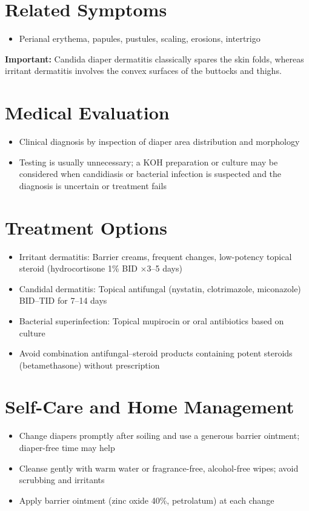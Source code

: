 \section*{Related Symptoms}
\begin{itemize}
  \item Perianal erythema, papules, pustules, scaling, erosions, intertrigo
\end{itemize}
\textbf{Important:} Candida diaper dermatitis classically spares the skin folds, whereas irritant dermatitis involves the convex surfaces of the buttocks and thighs.

\section*{Medical Evaluation}
\begin{itemize}
  \item Clinical diagnosis by inspection of diaper area distribution and morphology
  \item Testing is usually unnecessary; a KOH preparation or culture may be considered when candidiasis or bacterial infection is suspected and the diagnosis is uncertain or treatment fails
\end{itemize}

\section*{Treatment Options}
\begin{itemize}
  \item Irritant dermatitis: Barrier creams, frequent changes, low-potency topical steroid (hydrocortisone 1\% BID \ensuremath{\times}3--5 days)
  \item Candidal dermatitis: Topical antifungal (nystatin, clotrimazole, miconazole) BID--TID for 7--14 days
  \item Bacterial superinfection: Topical mupirocin or oral antibiotics based on culture
  \item Avoid combination antifungal--steroid products containing potent steroids (betamethasone) without prescription
\end{itemize}

\section*{Self-Care and Home Management}
\begin{itemize}
  \item Change diapers promptly after soiling and use a generous barrier ointment; diaper-free time may help
  \item Cleanse gently with warm water or fragrance-free, alcohol-free wipes; avoid scrubbing and irritants
  \item Apply barrier ointment (zinc oxide 40\%, petrolatum) at each change
\end{itemize}


